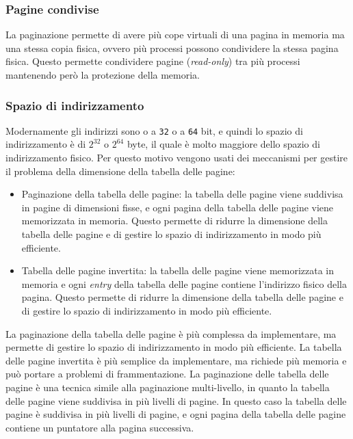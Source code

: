         \subsubsection{Pagine condivise}    
            La paginazione permette di avere più cope virtuali di una pagina in memoria ma una stessa copia fisica, ovvero più processi possono condividere la stessa pagina fisica. Questo permette condividere pagine (\textit{read-only}) tra più processi mantenendo però la protezione della memoria.
        \subsubsection{Spazio di indirizzamento}
            Modernamente gli indirizzi sono o a \texttt{32} o a \texttt{64} bit, e quindi lo spazio di indirizzamento è di $2^{32}$ o $2^{64}$ byte, il quale è molto maggiore dello spazio di indirizzamento fisico. Per questo motivo vengono usati dei meccanismi per gestire il problema della dimensione della tabella delle pagine:
            \begin{itemize}
                \item Paginazione della tabella delle pagine: la tabella delle pagine viene suddivisa in pagine di dimensioni fisse, e ogni pagina della tabella delle pagine viene memorizzata in memoria. Questo permette di ridurre la dimensione della tabella delle pagine e di gestire lo spazio di indirizzamento in modo più efficiente.
                \item Tabella delle pagine invertita: la tabella delle pagine viene memorizzata in memoria e ogni \textit{entry} della tabella delle pagine contiene l'indirizzo fisico della pagina. Questo permette di ridurre la dimensione della tabella delle pagine e di gestire lo spazio di indirizzamento in modo più efficiente.
            \end{itemize}
            La paginazione della tabella delle pagine è più complessa da implementare, ma permette di gestire lo spazio di indirizzamento in modo più efficiente. La tabella delle pagine invertita è più semplice da implementare, ma richiede più memoria e può portare a problemi di frammentazione.\newline
            La paginazione delle tabella delle pagine è una tecnica simile alla paginazione multi-livello, in quanto la tabella delle pagine viene suddivisa in più livelli di pagine. In questo caso la tabella delle pagine è suddivisa in più livelli di pagine, e ogni pagina della tabella delle pagine contiene un puntatore alla pagina successiva.  